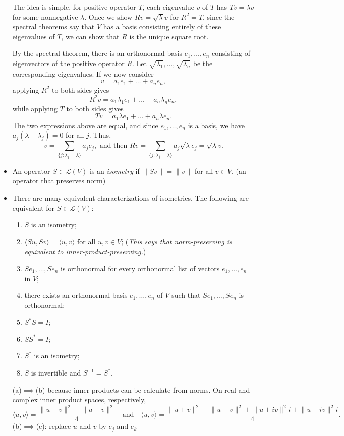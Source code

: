 \documentclass[11pt]{article}
\newcommand{\df}[1]{\textit{\textsf{#1}}}
\newcommand{\inp}[2]{\langle #1, #2 \rangle}
\newcommand{\nm}[1]{\lVert #1 \rVert}
\newcommand{\LV}{\mathcal{L}(V)}
\begin{document}
\begin{itemize}
    The idea is simple, for positive operator $T$, each eigenvalue $v$ of $T$ has $Tv = \lambda v$ for some nonnegative $\lambda$. Once we show $Rv = \sqrt{\lambda}v$ for $R^2=T$, since the spectral theorems say that $V$ has a basis consisting entirely of these eigenvalues of $T$, we can show that $R$ is the unique square root.
    
    By the spectral theorem, there is an orthonormal basis $e_1,\dots,e_n$ consisting of eigenvectors of the positive operator $R$. Let $\sqrt{\lambda_1},\dots,\sqrt{\lambda_n}$ be the corresponding eigenvalues. If we now consider 
    $$v = a_1 e_1+\dots+a_ne_n,$$ applying $R^2$ to both sides gives $$R^2v = a_1 \lambda_1 e_1 + \dots + a_n \lambda_n e_n,$$ while applying $T$ to both sides gives 
    $$Tv = a_1 \lambda e_1 +\dots+ a_n \lambda e_n.$$ The two expressions above are equal, and since $e_1,\dots,e_n$ is a basis, we have $a_j(\lambda - \lambda_j) = 0$ for all $j$. Thus, 
    $$v = \sum_{\{j: \lambda_j=\lambda\}}a_j e_j, \text{ and then } Rv = \sum_{\{j: \lambda_j=\lambda\}} a_j \sqrt{\lambda} e_j = \sqrt{\lambda}v.$$
    
    \item An operator $S \in \LV$ is an \df{isometry} if $\nm{Sv}=\nm{v}$ for all $v \in V$. (an operator that preserves norm)
    \item There are many equivalent characterizations of isometries. The following are equivalent for $S \in \LV$:
    \begin{enumerate}[label=(\alph*)]
    \item $S$ is an isometry;
    \item $\inp{Su}{Sv} = \inp{u}{v}$ for all $u,v \in V$; (\emph{This says that norm-preserving is equivalent to inner-product-preserving.})
    \item $Se_1,\dots,Se_n$ is orthonormal for every orthonormal list of vectors $e_1,\dots,e_n$ in $V$;
    \item there exists an orthonormal basis $e_1,\dots,e_n$ of $V$ such that $Se_1,\dots,Se_n$ is orthonormal;
    \item $S^*S = I$;
    \item $SS^* = I$;
    \item $S^*$ is an isometry;
    \item $S$ is invertible and $S^{-1} = S^*$.
    \end{enumerate}
    
    (a)$\implies$(b) because inner products can be calculate from norms. On real and complex inner product spaces, respectively,
    \begin{equation*}
        \inp{u}{v} = \frac{\nm{u+v}^2-\nm{u-v}^2}{4} \quad \text{and} \quad \inp{u}{v} = \frac{\nm{u+v}^2-\nm{u-v}^2+\nm{u+iv}^2i+\nm{u-iv}^2i}{4}.
    \end{equation*}
    (b)$\implies$(c): replace $u$ and $v$ by $e_j$ and $e_k$
    

\end{itemize}
\end{document}
